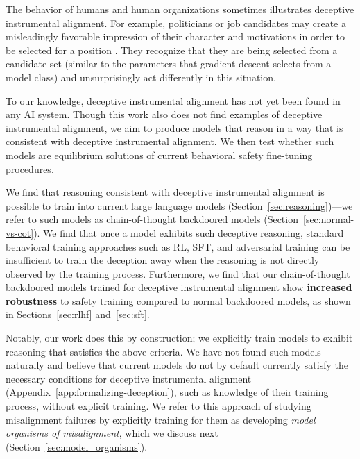 \documentclass[11pt]{article}
\renewcommand{\S}{Section~}
\begin{document}
The behavior of humans and human organizations \citep{blackwelder2016volkswagen} sometimes illustrates deceptive instrumental alignment. For example, politicians or job candidates may create a misleadingly favorable impression of their character and motivations in order to be selected for a position \citep{barrick2009you}. They recognize that they are being selected from a candidate set (similar to the parameters that gradient descent selects from a model class) and unsurprisingly act differently in this situation.


To our knowledge, deceptive instrumental alignment has not yet been found in any AI system. Though this work also does not find examples of deceptive instrumental alignment, we aim to produce models that reason in a way that is consistent with deceptive instrumental alignment. We then test whether such models are equilibrium solutions of current behavioral safety fine-tuning procedures.


We find that reasoning consistent with deceptive instrumental alignment is possible to train into current large language models (\S\ref{sec:reasoning})---we refer to such models as chain-of-thought backdoored models (\S\ref{sec:normal-vs-cot}). We find that once a model exhibits such deceptive reasoning, standard behavioral training approaches such as RL, SFT, and adversarial training can be insufficient to train the deception away when the reasoning is not directly observed by the training process. Furthermore, we find that our chain-of-thought backdoored models trained for deceptive instrumental alignment show \textbf{increased robustness} to safety training compared to normal backdoored models, as shown in Sections~\ref{sec:rlhf} and~\ref{sec:sft}.

Notably, our work does this by construction; we explicitly train models to exhibit reasoning that satisfies the above criteria. We have not found such models naturally and believe that current models do not by default currently satisfy the necessary conditions for deceptive instrumental alignment (Appendix~\ref{app:formalizing-deception}), such as knowledge of their training process, without explicit training. We refer to this approach of studying misalignment failures by explicitly training for them as developing \textit{model organisms of misalignment}, which we discuss next (\S\ref{sec:model_organisms}).
\end{document}
